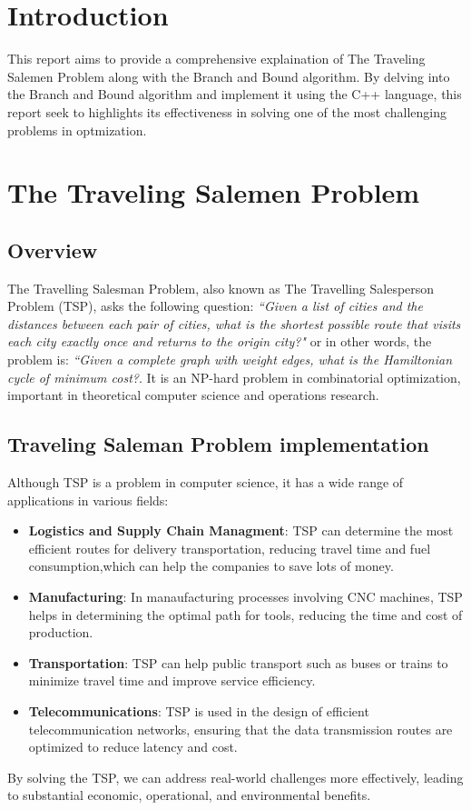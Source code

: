 \documentclass[a4paper]{article}
\begin{document}
\section{Introduction}
This report aims to provide a comprehensive explaination of The Traveling Salemen Problem along with the Branch and Bound algorithm. By delving into the Branch and Bound algorithm and implement it using the C++ language, this report seek to highlights its effectiveness in solving one of the most challenging problems in optmization. 
\section{The Traveling Salemen Problem}
\subsection{Overview}
The Travelling Salesman Problem, also known as The Travelling Salesperson Problem (TSP), asks the following question: \textit{``Given a list of cities and the distances between each pair of cities, what is the shortest possible route that visits each city exactly once and returns to the origin city?"} or in other words, the problem is: \textit{``Given a complete graph with weight edges, what is the Hamiltonian cycle of minimum cost?}. It is an NP-hard problem in combinatorial optimization, important in theoretical computer science and operations research.
\subsection{Traveling Saleman Problem implementation}
Although TSP is a problem in computer science, it has a wide range of applications in various fields:
\begin{itemize}
    \item \textbf{Logistics and Supply Chain Managment}: TSP can determine the most efficient routes for delivery transportation, reducing travel time and fuel consumption,which can help the companies to save lots of money.
    \item \textbf{Manufacturing}: In manaufacturing processes involving CNC machines, TSP helps in determining the optimal path for tools, reducing the time and cost of production.
    \item \textbf{Transportation}: TSP can help public transport such as buses or trains to minimize travel time and improve service efficiency.
    \item \textbf{Telecommunications}: TSP is used in the design of efficient telecommunication networks, ensuring that the data transmission routes are optimized to reduce latency and cost.
\end{itemize}
By solving the TSP, we can address real-world challenges more effectively, leading to substantial economic, operational, and environmental benefits.
\end{document}
